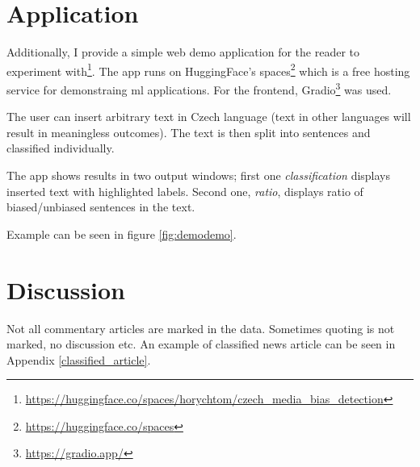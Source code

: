 
\section{Application}
Additionally, I provide a simple web demo application for the reader to experiment with\footnote{\url{https://huggingface.co/spaces/horychtom/czech_media_bias_detection}}. The app runs on HuggingFace's spaces\footnote{\url{https://huggingface.co/spaces}} which is a free hosting service for demonstraing \gls{ml} applications. For the frontend, Gradio\footnote{\url{https://gradio.app/}} was used.

The user can insert arbitrary text in Czech language (text in other languages will result in meaningless outcomes). The text is then split into sentences and classified individually.

The app shows results in two output windows; first one \textit{classification} displays inserted text with highlighted labels. Second one, \textit{ratio}, displays ratio of biased/unbiased sentences in the text.

Example can be seen in figure \ref{fig:demodemo}.

\begin{figure}[H]
\end{figure}




\section{Discussion}
Not all commentary articles are marked in the data.
Sometimes quoting is not marked, no discussion etc.
An example of classified news article can be seen in Appendix \ref{classified_article}.

